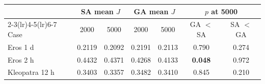 \begin{tabular}{@{}lcccccc@{}}
\toprule
 & \multicolumn{2}{c}{SA mean $J$} & \multicolumn{2}{c}{GA mean $J$} & \multicolumn{2}{c}{$p$ at 5000} \\
\cmidrule(lr){2-3}\cmidrule(lr){4-5}\cmidrule(lr){6-7}
Case & 2000 & 5000 & 2000 & 5000 & GA $<$ SA & SA $<$ GA \\
\midrule
Eros 1 d & 0.2119 & 0.2092 & 0.2191 & 0.2113 & 0.790 & 0.274 \\
Eros 2 h & 0.4432 & 0.4371 & 0.4268 & 0.4133 & \textbf{0.048} & 0.972 \\
Kleopatra 12 h & 0.3403 & 0.3357 & 0.3482 & 0.3410 & 0.845 & 0.210 \\
\bottomrule
\end{tabular}
